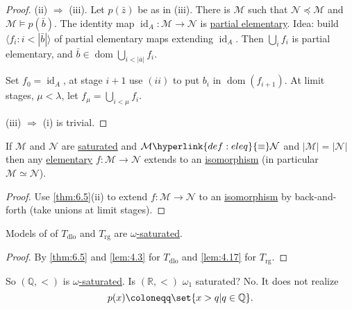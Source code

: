 \documentclass{article}
\let\models\vDash
\DeclareMathOperator{\dom}{dom}
\begin{document}
\begin{proof}
  (ii) $\Rightarrow$ (iii). %
  Let $p(\bar{z})$ be as in (iii). There is $\mathcal{M}$ such that $\mathcal{N} \preccurlyeq \mathcal{M}$ and $\mathcal{M} \models p(\bar{b})$.
  The identity map $\operatorname{id}_A: \mathcal{M} \to \mathcal{N}$ is \hyperlink{def:elmap}{partial elementary}.
  Idea: build $\langle f_i : i < |\bar{b}| \rangle$ of partial elementary maps extending $\operatorname{id}_A$.
  Then $\bigcup_i f_i$ is partial elementary, and $\bar{b} \in \dom \bigcup_{i < |\bar{a}|} f_i$.

  Set $f_0 = \operatorname{id}_A$, at stage $i+1$ use $(ii)$ to put $b_i$ in $\dom(f_{i+1})$.
  At limit stages, $\mu < \lambda$, let $f_{\mu} = \bigcup_{i < \mu} f_i$.

  (iii) $\Rightarrow$ (i) is trivial.
\end{proof}
\begin{ncor}\label{cor:6.6}
  If $\mathcal{M}$ and $\mathcal{N}$ are \hyperlink{def:sat}{saturated} and $\mathcal{M} \hyperlink{def:eleq}{\equiv} \mathcal{N}$ and $|\mathcal{M}| = |\mathcal{N}|$ then any \hyperlink{def:elmap}{elementary} $f: \mathcal{M} \to \mathcal{N}$ extends to an \hyperlink{def:iso}{isomorphism} (in particular \hyperlink{def:iso}{$\mathcal{M} \simeq \mathcal{N}$}).
\end{ncor}
\begin{proof}
  Use \cref{thm:6.5}(ii) to extend $f: \mathcal{M} \to \mathcal{N}$ to an \hyperlink{def:iso}{isomorphism} by back-and-forth (take unions at limit stages).
\end{proof}
\begin{ncor}\label{cor:6.7}
  Models of of $T_{\text{dlo}}$ and $T_{\text{rg}}$ are \hyperlink{def:sat}{$\omega$-saturated}.
\end{ncor}
\begin{proof}
  By \cref{thm:6.5} and \cref{lem:4.3} for $T_{\text{dlo}}$ and \cref{lem:4.17} for $T_{\text{rg}}$.
\end{proof}

So $(\mathbb{Q}, <)$ is \hyperlink{def:sat}{$\omega$-saturated}.
Is $(\mathbb{R}, <)$ $\omega_1$ saturated? No. It does not realize
\begin{equation*}p(x) \coloneqq \set{x > q | q \in \mathbb{Q}}.\end{equation*}
\end{document}

